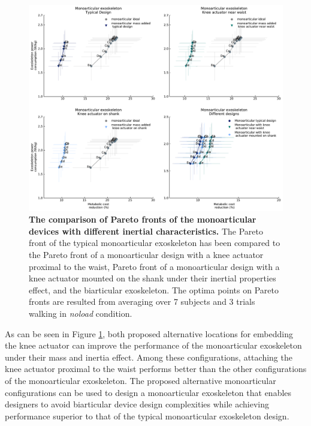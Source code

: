 \documentclass[10pt,letterpaper]{article}
\begin{document}
\begin{figure}[ht]   
	\centering
	\includegraphics[width=\linewidth]{Pareto_Mass_Regenration_Figures/PaperFigure_MonoarticularExoskeleton_DifferentConfigs.pdf}
	\vspace{1mm}
	\caption{{\small\textbf{The comparison of Pareto fronts of the monoarticular devices with different inertial characteristics.} The Pareto front of the typical monoarticular exoskeleton has been compared to the Pareto front of a monoarticular design with a knee actuator proximal to the waist, Pareto front of a monoarticular design with a knee actuator mounted on the shank under their inertial properties effect, and the biarticular exoskeleton. The optima points on Pareto fronts are resulted from averaging over 7 subjects and 3 trials walking in {\it noload} condition.}}
	\label{Fig_MonoarticularExoskeleton_DifferentConfigs}
\end{figure}
As can be seen in Figure  \ref{Fig_MonoarticularExoskeleton_DifferentConfigs}, both proposed alternative locations for embedding the knee actuator can improve the performance of the monoarticular exoskeleton under their mass and inertia effect. Among these configurations, attaching the knee actuator proximal to the waist performs better than the other configurations of the monoarticular exoskeleton. The proposed alternative monoarticular configurations can be used to design a monoarticular exoskeleton that enables designers to avoid biarticular device design complexities while achieving performance superior to that of the typical monoarticular exoskeleton design.\\
\end{document}
